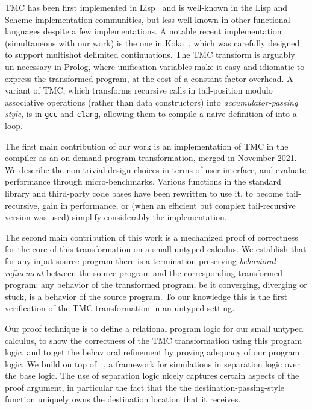 TMC has been first implemented in Lisp~\citep*{risch-73,friedman-wise-75} and is well-known in the Lisp and Scheme implementation communities, but less well-known in other functional languages despite a few implementations\citep*{opal-1994,tmc-scala-2013}. A notable recent implementation (simultaneous with our work) is the one in Koka~\citep*{tmc-koka-2023}, which was carefully designed to support multishot delimited continuations. The TMC transform is arguably un-necessary in Prolog, where unification variables make it easy and idiomatic to express the transformed program, at the cost of a constant-factor overhead. A variant of TMC, which transforms recursive calls in tail-position modulo associative operations (rather than data constructors) into \emph{accumulator-passing style}, is in \texttt{gcc} and \texttt{clang}, allowing them to compile a naive definition of  into a loop.

The first main contribution of our work is an implementation of TMC in the \OCaml compiler as an on-demand program transformation,
merged in November 2021.
%
We describe the non-trivial design choices in terms of user interface, and evaluate performance through micro-benchmarks.
%
Various functions in the standard library and third-party code bases have been rewritten to use it, to become tail-recursive, gain in performance, or (when an efficient but complex tail-recursive version was used) simplify considerably the implementation.

The second main contribution of this work is a mechanized proof of correctness for the core of this transformation on a small untyped calculus.
%
We establish that for any input source program there is a termination-preserving \emph{behavioral refinement} between the source program and the corresponding transformed program: any behavior of the transformed program, be it converging, diverging or stuck, is a behavior of the source program.
%
To our knowledge this is the first verification of the TMC transformation in an untyped setting.

Our proof technique is to define a relational program logic for our small untyped calculus, to show the correctness of the TMC transformation using this program logic, and to get the behavioral refinement by proving adequacy of our program logic. We build on top of \Simuliris~\citep*{simuliris-2022}, a framework for simulations in separation logic over the \Iris base logic. The use of separation logic nicely captures certain aspects of the proof argument, in particular the fact that the the destination-passing-style function uniquely owns the destination location that it receives.

